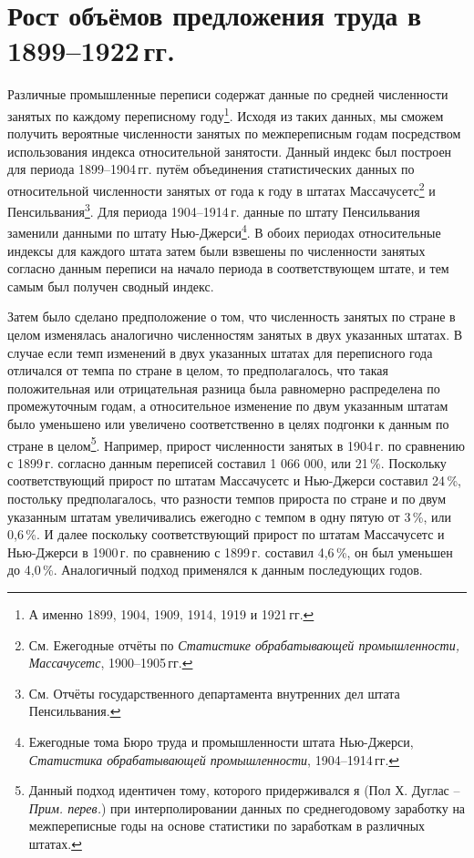\documentclass[leqno]{article}  %
\begin{document}
\section{Рост объёмов предложения труда в \\ 1899--1922\,гг.}
Различные промышленные переписи содержат данные по средней численности занятых по каждому переписному году\footnote{А именно 1899, 1904, 1909, 1914, 1919 и 1921\,гг.}. Исходя из таких данных, мы сможем получить вероятные численности занятых по межпереписным годам посредством использования индекса относительной занятости. Данный индекс был построен для периода 1899--1904\,гг. путём объединения статистических данных по относительной численности занятых от года к году в штатах Массачусетс\footnote{См. Ежегодные отчёты по \emph{Статистике обрабатывающей промышленности, Массачусетс}, 1900--1905\,гг.} и Пенсильвания\footnote{См. Отчёты государственного департамента внутренних дел штата Пенсильвания.}. Для периода 1904--1914\,г. данные по штату Пенсильвания заменили данными по штату Нью-Джерси\footnote{Ежегодные тома Бюро труда и промышленности штата Нью-Джерси, \emph{Статистика обрабатывающей промышленности}, 1904--1914\,гг.}. В обоих периодах относительные индексы для каждого штата затем были взвешены по численности занятых согласно данным переписи на начало периода в соответствующем штате, и тем самым был получен сводный индекс.
\par
Затем было сделано предположение о том, что численность занятых по стране в целом изменялась аналогично численностям занятых в двух указанных штатах. В случае если темп изменений в двух указанных штатах для переписного года отличался от темпа по стране в целом, то предполагалось, что такая положительная или отрицательная разница была равномерно распределена по промежуточным годам, а относительное изменение по двум указанным штатам было уменьшено или увеличено соответственно в целях подгонки к данным по стране в целом\footnote{Данный подход идентичен тому, которого придерживался я (Пол Х. Дуглас -- \emph{Прим. перев.}) при интерполировании данных по среднегодовому заработку на межпереписные годы на основе статистики по заработкам в различных штатах.}. Например, прирост численности занятых в 1904\,г. по сравнению с 1899\,г. согласно данным переписей составил 1 066 000, или 21\,\%. Поскольку соответствующий прирост по штатам Массачусетс и Нью-Джерси составил 24\,\%, постольку предполагалось, что разности темпов прироста по стране и по двум указанным штатам увеличивались ежегодно с темпом в одну пятую от 3\,\%, или 0,6\,\%. И далее поскольку соответствующий прирост по штатам Массачусетс и Нью-Джерси в 1900\,г. по сравнению с 1899\,г. составил 4,6\,\%, он был уменьшен до 4,0\,\%. Аналогичный подход применялся к данным последующих годов.
\end{document}
